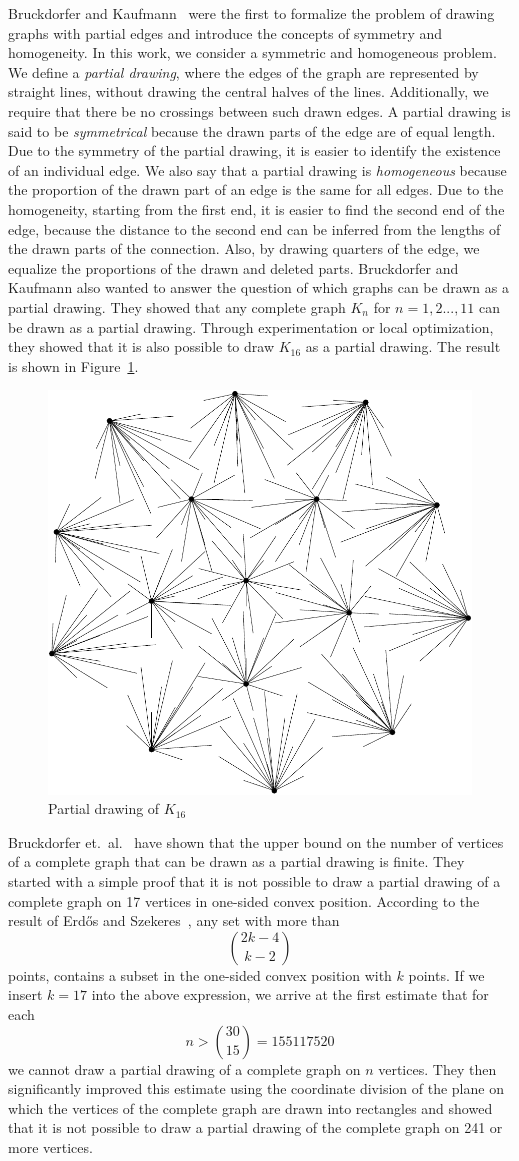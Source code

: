 Bruckdorfer and Kaufmann~\cite{BK} were the first to formalize the problem of drawing graphs with partial edges and introduce the concepts of symmetry and homogeneity. In this work, we consider a symmetric and homogeneous problem. We define a {\it partial drawing}, where the edges of the graph are represented by straight lines, without drawing the central halves of the lines. Additionally, we require that there be no crossings between such drawn edges. A partial drawing is said to be {\it symmetrical} because the drawn parts of the edge are of equal length. Due to the symmetry of the partial drawing, it is easier to identify the existence of an individual edge. We also say that a partial drawing is {\it homogeneous} because the proportion of the drawn part of an edge is the same for all edges. Due to the homogeneity, starting from the first end, it is easier to find the second end of the edge, because the distance to the second end can be inferred from the lengths of the drawn parts of the connection. Also, by drawing quarters of the edge, we equalize the proportions of the drawn and deleted parts. Bruckdorfer and Kaufmann also wanted to answer the question of which graphs can be drawn as a partial drawing. They showed that any complete graph $K_{n}$ for $n = 1,2 ..., 11$ can be drawn as a partial drawing. Through experimentation or local optimization, they showed that it is also possible to draw $K_{16}$ as a partial drawing. The result is shown in Figure~\ref{fig: K_16}.

\begin{figure}
  \centering
  \includegraphics[width=.3\textwidth]{./figures/K16PEDCropped.pdf}
  \caption{Partial drawing of $K_{16}$}
  \label{fig: K_16}
\end{figure}


Bruckdorfer et.\ al.~\cite{Bruckdorfer} have shown that the upper bound on the number of vertices of a complete graph that can be drawn as a partial drawing is finite. They started with a simple proof that it is not possible to draw a partial drawing of a complete graph on 17 vertices in one-sided convex position. According to the result of Erd\H{o}s and Szekeres~\cite{Erdos}, any set with more than
\begin{equation*}
  \binom{2k-4}{k-2}
\end{equation*}
points, contains a subset in the one-sided convex position with $k$ points. If we insert $k = 17$ into the above expression, we arrive at the first estimate that for each
$$
  n > \binom{30}{15} = 155117520
$$
we cannot draw a partial drawing of a complete graph on $n$ vertices. They then significantly improved this estimate using the coordinate division of the plane on which the vertices of the complete graph are drawn into rectangles and showed that it is not possible to draw a partial drawing of the complete graph on 241 or more vertices.

